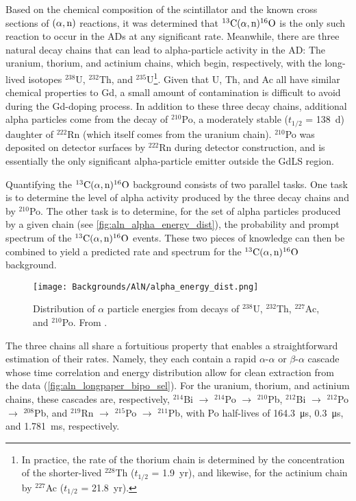 \documentclass[../thesis.tex]{subfiles}
\begin{document}
Based on the chemical composition of the scintillator and the known cross sections of $(\alpha,\mathrm{n})$ reactions, it was determined that $^{13}\mathrm{C}(\alpha, \mathrm{n})^{16}\mathrm{O}$ is the only such reaction to occur in the ADs at any significant rate. Meanwhile, there are three natural decay chains that can lead to alpha-particle activity in the AD: The uranium, thorium, and actinium chains, which begin, respectively, with the long-lived isotopes $^{238}$U, $^{232}$Th, and $^{235}$U\footnote{In practice, the rate of the thorium chain is determined by the concentration of the shorter-lived $^{228}$Th ($t_{1/2}$ = 1.9~yr), and likewise, for the actinium chain by $^{227}$Ac ($t_{1/2}$ = 21.8~yr).}. Given that U, Th, and Ac all have similar chemical properties to Gd, a small amount of contamination is difficult to avoid during the Gd-doping process. In addition to these three decay chains, additional alpha particles come from the decay of $^{210}$Po, a moderately stable ($t_{1/2}$ = 138~d) daughter of $^{222}$Rn (which itself comes from the uranium chain). $^{210}$Po was deposited on detector surfaces by $^{222}$Rn during detector construction, and is essentially the only significant alpha-particle emitter outside the GdLS region.

Quantifying the $^{13}\mathrm{C}(\alpha, \mathrm{n})^{16}\mathrm{O}$ background consists of two parallel tasks. One task is to determine the level of alpha activity produced by the three decay chains and by $^{210}$Po. The other task is to determine, for the set of alpha particles produced by a given chain (see \autoref{fig:aln_alpha_energy_dist}), the probability and prompt spectrum of the $^{13}\mathrm{C}(\alpha, \mathrm{n})^{16}\mathrm{O}$ events. These two pieces of knowledge can then be combined to yield a predicted rate and spectrum for the $^{13}\mathrm{C}(\alpha, \mathrm{n})^{16}\mathrm{O}$ background.

\begin{figure}[ht]
  \texttt{[image: Backgrounds/AlN/alpha\_energy\_dist.png]}
  \caption{Distribution of $\alpha$ particle energies from decays of $^{238}$U, $^{232}$Th, $^{227}$Ac, and $^{210}$Po. From \cite{Zhao_2014}.}
  \label{fig:aln_alpha_energy_dist}
\end{figure}

The three chains all share a fortuitious property that enables a straightforward estimation of their rates. Namely, they each contain a rapid $\alpha$-$\alpha$ or $\beta$-$\alpha$ cascade whose time correlation and energy distribution allow for clean extraction from the data (\autoref{fig:aln_longpaper_bipo_sel}). For the uranium, thorium, and actinium chains, these cascades are, respectively, $^{214}$Bi $\to$ $^{214}$Po $\to$ $^{210}$Pb, $^{212}$Bi $\to$ $^{212}$Po $\to$ $^{208}$Pb, and $^{219}$Rn $\to$ $^{215}$Po $\to$ $^{211}$Pb, with Po half-lives of \SI{164.3}{\micro s}, \SI{0.3}{\micro s}, and \SI{1.781}{ms}, respectively.
\end{document}
